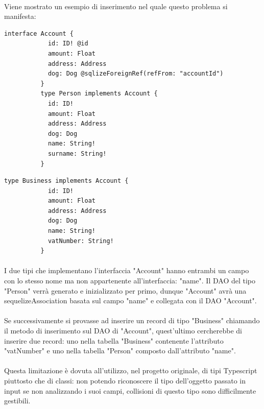 \documentclass[a4paper, 12pt]{report}
\begin{document}
        \paragraph*{}
        Viene mostrato un esempio di inserimento nel quale questo problema si manifesta:
        \begin{Verbatim}[samepage=true]
          interface Account {
            id: ID! @id
            amount: Float
            address: Address
            dog: Dog @sqlizeForeignRef(refFrom: "accountId")
          }
          type Person implements Account {
            id: ID!
            amount: Float
            address: Address
            dog: Dog
            name: String!
            surname: String!
          }
        \end{Verbatim}
        \begin{Verbatim}[samepage=true]
          type Business implements Account {
            id: ID!
            amount: Float
            address: Address
            dog: Dog
            name: String!
            vatNumber: String!
          }
        \end{Verbatim}
        \paragraph*{}
        I due tipi che implementano l'interfaccia "Account" hanno entrambi un campo con lo stesso nome ma non appartenente all'interfaccia: "name".
        Il DAO del tipo "Person" verrà generato e inizializzato per primo, dunque "Account" avrà una sequelizeAssociation basata sul campo "name" e collegata con il DAO "Account".
        \paragraph*{}
        Se successivamente si provasse ad inserire un record di tipo "Business" chiamando il metodo di inserimento sul DAO di "Account", quest'ultimo cercherebbe di inserire due record: uno nella tabella "Business" contenente l'attributo "vatNumber" e uno nella tabella "Person" composto dall'attributo "name".
        \paragraph*{}
        Questa limitazione è dovuta all'utilizzo, nel progetto originale, di tipi Typescript piuttosto che di classi: non potendo riconoscere il tipo dell'oggetto passato in input se non analizzando i suoi campi, collisioni di questo tipo sono difficilmente gestibili.
\end{document}
